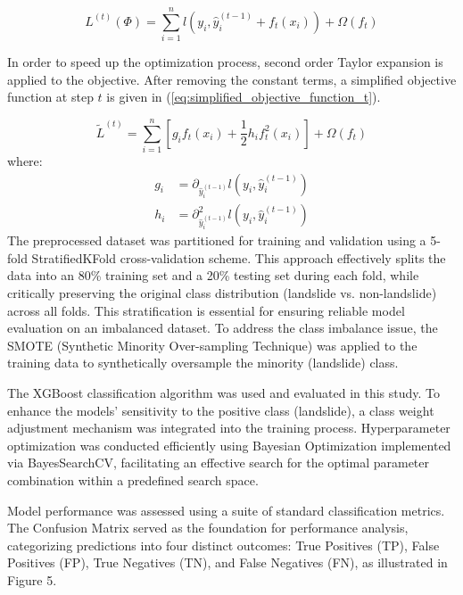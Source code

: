 \begin{equation} \label{eq:objective_function_t}
L^{(t)}(\Phi) = \sum_{i=1}^n l(y_i, \hat{y}_i^{(t-1)} + f_t(x_i)) + \Omega(f_t)
\end{equation}

In order to speed up the optimization process, second order Taylor expansion is applied to the objective. After removing the constant terms, a simplified objective function at step $t$ is given in (\ref{eq:simplified_objective_function_t}).

\begin{equation} \label{eq:simplified_objective_function_t}
\tilde{L}^{(t)} = \sum_{i=1}^n \left[ g_i f_t(x_i) + \frac{1}{2} h_i f_t^2(x_i) \right] + \Omega(f_t)
\end{equation}
where:
\begin{align} \label{eq:g_h_definitions}
g_i &= \partial_{\hat{y}_i^{(t-1)}} l(y_i, \hat{y}_i^{(t-1)}) \\
h_i &= \partial_{\hat{y}_i^{(t-1)}}^2 l(y_i, \hat{y}_i^{(t-1)})
\end{align}
The preprocessed dataset was partitioned for training and validation using a 5-fold StratifiedKFold cross-validation scheme\cite{mthd06}. This approach effectively splits the data into an 80\% training set and a 20\% testing set during each fold, while critically preserving the original class distribution (landslide vs. non-landslide) across all folds. This stratification is essential for ensuring reliable model evaluation on an imbalanced dataset. To address the class imbalance issue, the SMOTE (Synthetic Minority Over-sampling Technique) was applied to the training data to synthetically oversample the minority (landslide) class\cite{mthd07}.

The XGBoost classification algorithm was used and evaluated in this study. To enhance the models' sensitivity to the positive class (landslide), a class weight adjustment mechanism was integrated into the training process. Hyperparameter optimization was conducted efficiently using Bayesian Optimization implemented via BayesSearchCV\cite{mthd08}, facilitating an effective search for the optimal parameter combination within a predefined search space.

Model performance was assessed using a suite of standard classification metrics. The Confusion Matrix served as the foundation for performance analysis\cite{mthd09}, categorizing predictions into four distinct outcomes: True Positives (TP), False Positives (FP), True Negatives (TN), and False Negatives (FN), as illustrated in Figure 5.

